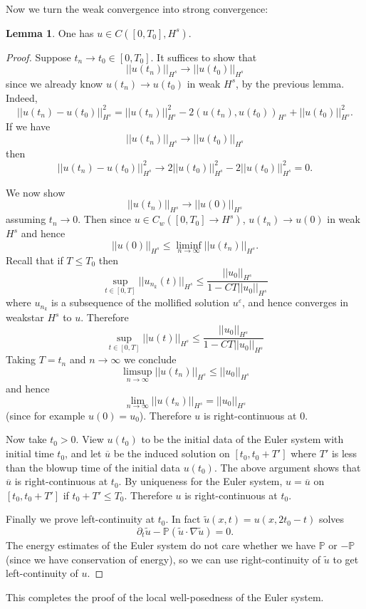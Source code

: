 \documentclass[12pt]{book}
\newcommand{\PP}{\mathbb{P}}
\theoremstyle{definition}
\newtheorem{lemma}[theorem]{Lemma}
\begin{document}
Now we turn the weak convergence into strong convergence:

\begin{lemma}
One has $u \in C([0, T_0], H^s)$.
\end{lemma}
\begin{proof}
Suppose $t_n \to t_0 \in [0, T_0]$. It suffices to show that
$$||u(t_n)||_{H^s} \to ||u(t_0)||_{H^s}$$
since we already know $u(t_n) \to u(t_0)$ in weak $H^s$, by the previous lemma.
Indeed,
$$||u(t_n) - u(t_0)||_{H^s}^2 = ||u(t_n)||_{H^s}^2 - 2(u(t_n), u(t_0))_{H^s} + ||u(t_0)||_{H^s}^2.$$
If we have
$$||u(t_n)||_{H^s} \to ||u(t_0)||_{H^s}$$
then
$$||u(t_n) - u(t_0)||_{H^s}^2 \to 2||u(t_0)||_{H^s}^2 - 2||u(t_0)||_{H^s}^2 = 0.$$

We now show
$$||u(t_n)||_{H^s} \to ||u(0)||_{H^s}$$
assuming $t_n \to 0$.
Then since $u \in C_w([0, T_0] \to H^s)$, $u(t_n) \to u(0)$ in weak $H^s$ and hence
$$||u(0)||_{H^s} \leq \liminf_{n \to \infty} ||u(t_n)||_{H^s}.$$
Recall that if $T \leq T_0$ then
$$\sup_{t \in [0, T]} ||u_{n_k}(t)||_{H^s} \leq \frac{||u_0||_{H^s}}{1 - CT||u_0||_{H^s}}$$
where $u_{n_k}$ is a subsequence of the mollified solution $u^\varepsilon$, and hence converges in weakstar $H^s$ to $u$.
Therefore
$$\sup_{t \in [0, T]} ||u(t)||_{H^s} \leq \frac{||u_0||_{H^s}}{1 - CT||u_0||_{H^s}}$$
Taking $T = t_n$ and $n \to \infty$ we conclude
$$\limsup_{n \to \infty} ||u(t_n)||_{H^s} \leq ||u_0||_{H^s}$$
and hence
$$\lim_{n \to \infty} ||u(t_n)||_{H^s} = ||u_0||_{H^s}$$
(since for example $u(0) = u_0$).
Therefore $u$ is right-continuous at $0$.

Now take $t_0 > 0$.
View $u(t_0)$ to be the initial data of the Euler system with initial time $t_0$, and let $\overline u$ be the induced solution on $[t_0, t_0 + T']$ where $T'$ is less than the blowup time of the initial data $u(t_0)$.
The above argument shows that $\overline u$ is right-continuous at $t_0$.
By uniqueness for the Euler system, $u = \overline u$ on $[t_0, t_0 + T']$ if $t_0 + T' \leq T_0$.
Therefore $u$ is right-continuous at $t_0$.

Finally we prove left-continuity at $t_0$.
In fact $\tilde u(x, t) = u(x, 2t_0 - t)$ solves
$$\partial_t \tilde u - \PP(\tilde u \cdot \nabla \tilde u) = 0.$$
The energy estimates of the Euler system do not care whether we have $\PP$ or $-\PP$ (since we have conservation of energy), so we can use right-continuity of $\tilde u$ to get left-continuity of $u$.
\end{proof}

This completes the proof of the local well-posedness of the Euler system.
\end{document}
